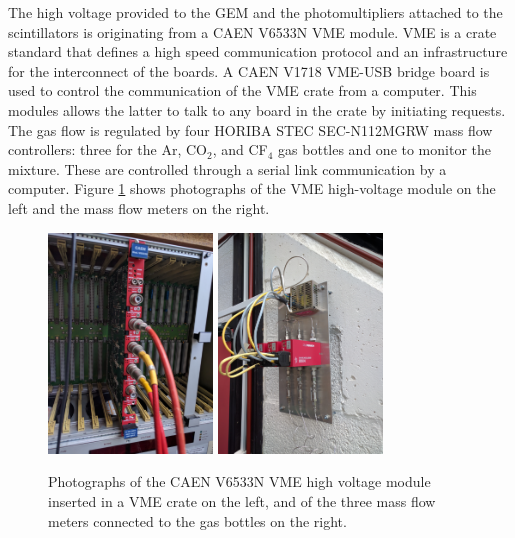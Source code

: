     The high voltage provided to the GEM and the photomultipliers attached to the scintillators is originating from a CAEN V6533N VME module. VME \cite{VMEBUS-ANSI} is a crate standard that defines a high speed communication protocol and an infrastructure for the interconnect of the boards. A CAEN V1718 VME-USB bridge board is used to control the communication of the VME crate from a computer. This modules allows the latter to talk to any board in the crate by initiating requests. The gas flow is regulated by four HORIBA STEC SEC-N112MGRW mass flow controllers: three for the Ar, CO$_2$, and CF$_4$ gas bottles and one to monitor the mixture. These are controlled through a serial link communication by a computer. Figure \ref{fig:III-1-gas-hv} shows photographs of the VME high-voltage module on the left and the mass flow meters on the right.

    \begin{figure}[h!]
      \centering
      \includegraphics[width=0.39\textwidth]{img/III-1-arch/hv.jpg}
      \includegraphics[width=0.39\textwidth]{img/III-1-arch/gas.jpg}
      \caption{Photographs of the CAEN V6533N VME high voltage module inserted in a VME crate on the left, and of the three mass flow meters connected to the gas bottles on the right.}
      \label{fig:III-1-gas-hv}
    \end{figure}

